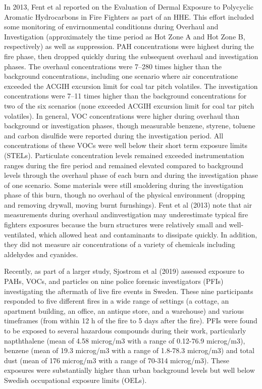 \documentclass[12pt,oneside]{book}
\begin{document}
In 2013, Fent et al reported on the Evaluation of Dermal Exposure to Polycyclic Aromatic Hydrocarbons in Fire Fighters as part of an HHE.  This effort included some monitoring of envirnonmental conditionns during Overhaul and Investigation (approximately the time period as Hot Zone A and Hot Zone B, respectively) as well as suppression. PAH concentrations were highest during the fire phase, then dropped quickly during the subsequent overhaul and investigation phases. The overhaul concentrations were 7–280 times higher than the background concentrations, including one scenario where air concentratione exceeded the ACGIH excursion limit for coal tar pitch volatiles. The investigation concentrations were 7–11 times higher than the background concentrations for two of the six scenarios (none exceeded ACGIH excursion limit for coal tar pitch volatiles). In general, VOC concentrations were higher during overhaul than background or investigation phases, though measurable benzene, styrene, toluene and carbon disulfide were reported during the investigation period. All concentrations of these VOCs were well below their short term exposure limits (STELs). Particulate concentration levels remained exceeded instrumentation ranges during the fire period and remained elevated compared to background levels through the overhaul phase of each burn and during the investigation phase of one scenario. Some materials were still smoldering during the investigation phase of this burn, though no overhaul of the physical environment (dropping and removing drywall, moving burnt furnshings). Fent et al (2013) note that air measurements during overhaul andinvestigation may underestimate typical fire fighters exposures because the burn structures were relatively small and well-ventilated, which allowed heat and contaminants to dissipate quickly. In addition, they did not measure air concentrations of a variety of chemicals including aldehydes and cyanides.


Recently, as part of a larger study, Sjostrom et al (2019) assessed  exposure to PAHs, VOCs, and particles on nine police forensic investigators (PFIs) investigating the aftermath of live fire events in Sweden. These nine participants responded to five different fires in a wide range of settings (a cottage, an apartment building, an office, an antique store, and a warehouse) and various timeframes (from within 12 h of the fire to 5 days after the fire). PFIs were found to be exposed to several hazardous compounds during their work, particularly napththalene (mean of 4.58 microg/m3 with a range of 0.12-76.9 microg/m3), benzene (mean of 19.3 microg/m3 with a range of 1.8-78.3 microg/m3) and total dust (mean of 176 microg/m3 with a range of 70-314 microg/m3). These exposures were substantially higher than urban background levels but well below Swedish occupational exposure limits (OELs).
\end{document}
